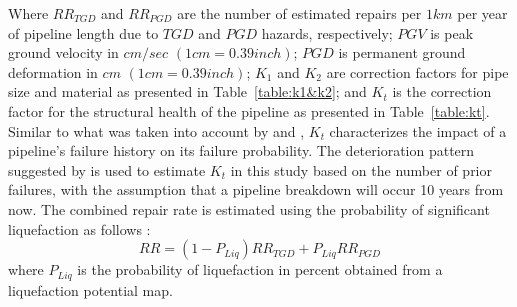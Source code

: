     Where $RR_{TGD}$ and $RR_{PGD}$ are the number of estimated repairs per $1 km$ per year of pipeline length due to $TGD$ and $PGD$ hazards, respectively; $PGV$ is peak ground velocity in $cm/sec$ $(1 cm = 0.39 inch)$; $PGD$ is permanent ground deformation in $cm$ $(1 cm = 0.39 inch)$; $K_1$ and $K_2$ are correction factors for pipe size and material as presented in Table~\ref{table:k1&k2}; and $K_t$ is the correction factor for the structural health of the pipeline as presented in Table~\ref{table:kt}. Similar to what was taken into account by \cite{fragiadakis_seismic_2014} and \cite{ball_baltimores_2015}, $K_t$ characterizes the impact of a pipeline's failure history on its failure probability. The deterioration pattern suggested by \cite{fragiadakis_seismic_2014} is used to estimate $K_t$ in this study based on the number of prior failures, with the assumption that a pipeline breakdown will occur 10 years from now.
    The combined repair rate is estimated using the probability of significant liquefaction as follows \cite{american_lifelines_alliance_ala_seismic_2001}: 
    $$RR=(1-P_{Liq})RR_{TGD}+P_{Liq}RR_{PGD}$$
    where $P_{Liq}$ is the probability of liquefaction in percent obtained from a liquefaction potential map.\\ 
    
    
    
    
